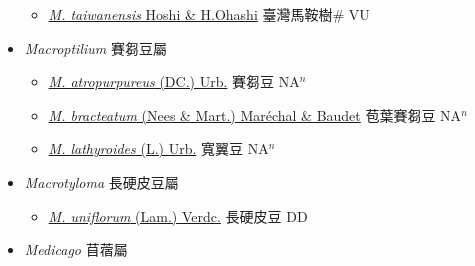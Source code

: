 \begin{itemize}
  \begin{itemize}
        \item[] \href{http://www.theplantlist.org/tpl1.1/search?q=Maackia+taiwanensis}{\textit{M. taiwanensis} Hoshi \& H.Ohashi}   臺灣馬鞍樹\# VU
  \end{itemize}
 \item[] \textit{Macroptilium} 賽芻豆屬
                    
  \begin{itemize}
        \item[] \href{http://www.theplantlist.org/tpl1.1/search?q=Macroptilium+atropurpureus}{\textit{M. atropurpureus} (DC.) Urb.}   賽芻豆 NA$^n$
        \item[] \href{http://www.theplantlist.org/tpl1.1/search?q=Macroptilium+bracteatum}{\textit{M. bracteatum} (Nees \& Mart.) Maréchal \& Baudet}   苞葉賽芻豆 NA$^n$
        \item[] \href{http://www.theplantlist.org/tpl1.1/search?q=Macroptilium+lathyroides}{\textit{M. lathyroides} (L.) Urb.}   寬翼豆 NA$^n$
  \end{itemize}
 \item[] \textit{Macrotyloma} 長硬皮豆屬
                    
  \begin{itemize}
        \item[] \href{http://www.theplantlist.org/tpl1.1/search?q=Macrotyloma+uniflorum}{\textit{M. uniflorum} (Lam.) Verdc.}   長硬皮豆 DD
  \end{itemize}
 \item[] \textit{Medicago} 苜蓿屬
                    

\end{itemize}
